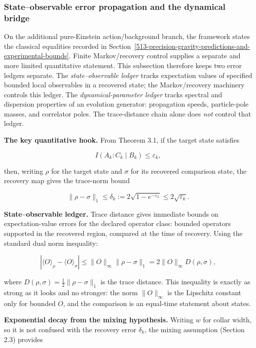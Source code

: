\subsubsection{State--observable error propagation and the dynamical bridge}\label{514-theory-side-error-propagation-from-markov-bounds}

On the additional pure-Einstein action/background branch, the framework states the classical equalities recorded in Section~\ref{513-precision-gravity-predictions-and-experimental-bounds}. Finite Markov/recovery control supplies a separate and more limited quantitative statement. This subsection therefore keeps two error ledgers separate. The \emph{state--observable ledger} tracks expectation values of specified bounded local observables in a recovered state; the Markov/recovery machinery controls this ledger. The \emph{dynamical-parameter ledger} tracks spectral and dispersion properties of an evolution generator: propagation speeds, particle-pole masses, and correlator poles. The trace-distance chain alone does \emph{not} control that ledger.

\textbf{The key quantitative hook.} From Theorem 3.1, if the target state satisfies

\[
I(A_k : C_k \mid B_k) \le \varepsilon_k,
\]

then, writing \(\rho\) for the target state and \(\sigma\) for its recovered comparison state, the recovery map gives the trace-norm bound

\[
\|\rho-\sigma\|_1\le \delta_k
:=2\sqrt{1-e^{-\varepsilon_k}}
\le2\sqrt{\varepsilon_k}.
\]

\textbf{State--observable ledger.} Trace distance gives immediate bounds on expectation-value errors for the declared operator class: bounded operators supported in the recovered region, compared at the time of recovery. Using the standard dual norm inequality:

\[
|\langle O \rangle_\rho - \langle O \rangle_\sigma|
\le \|O\|_\infty \|\rho - \sigma\|_1 = 2 \|O\|_\infty D(\rho, \sigma),
\]

where \(D(\rho, \sigma) = \frac{1}{2}\|\rho - \sigma\|_1\) is the trace distance. This inequality is exactly as strong as it looks and no stronger: the norm \(\|O\|_\infty\) is the Lipschitz constant only for bounded \(O\), and the comparison is an equal-time statement about states.

\textbf{Exponential decay from the mixing hypothesis.} Writing \(w\) for collar width, so it is not confused with the recovery error \(\delta_k\), the mixing assumption (Section 2.3) provides

